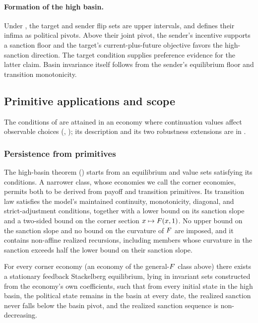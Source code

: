 \paragraph{Formation of the high basin.}
\label{sec:mechanism:basin}
Under , the target and sender flip sets are upper
intervals, and  defines their infima as political
pivots. Above their joint pivot, the sender's incentive supports a
sanction floor and the target's current-plus-future objective favors
the high-sanction direction. The target condition supplies preference
evidence for the latter claim. Basin invariance itself follows from the
sender's equilibrium floor and transition monotonicity.

\subsection{Primitive applications and scope}
\label{sec:existence:nonvacuity}

The conditions of  are attained in an economy where
continuation values affect observable choices (,
); its description and its two robustness
extensions are in .

\subsubsection{Persistence from primitives}
\label{sec:existence:primitive-persistence}

The high-basin theorem () starts from an equilibrium and value sets satisfying its conditions.
A narrower class, whose economies we call the corner economies, permits both to be derived from payoff and transition
primitives. Its transition law satisfies the model's maintained
continuity, monotonicity, diagonal, and strict-adjustment conditions,
together with a lower bound on its sanction slope and a two-sided bound on the
corner section $x\mapsto F(x,1)$. No upper bound on the sanction slope and no bound on the
curvature of $F$ are imposed, and
it contains non-affine realized recursions, including members whose
curvature in the sanction exceeds half the lower bound on their sanction slope.

\begin{proposition}
\label{prop:primitive-persistence}
For every corner economy (an economy of the general-$F$ class above) there exists a
stationary feedback Stackelberg equilibrium, lying in invariant sets constructed from the
economy's own coefficients, such that from every initial state in the
high basin, the political state remains in the basin at every date, the
realized sanction never falls below the basin pivot, and the realized
sanction sequence is non-decreasing.
\end{proposition}

